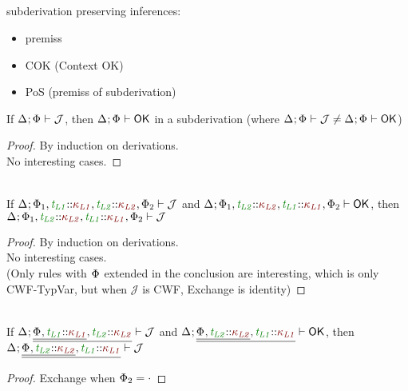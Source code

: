 \documentclass[11pt]{article}
\begin{document}
    \subsection*{}
    subderivation preserving inferences:
    \begin{itemize}
        \item premiss
        \item COK (Context OK)
        \item PoS (premiss of subderivation)
    \end{itemize}
    \begin{lemma}[COK]
        If $\J$, then $\ContextWellFormed$ in a subderivation (where $\J\neq\ContextWellFormed$)
    \end{lemma}
    \begin{proof}
        By induction on derivations. \\
        No interesting cases.
    \end{proof}
    \noindent\hrulefill
    \begin{lemma}[Exchange]
        \vphantom{.}\\
        If $\J[\HoleCtx\TypVarCtx[][1],\typvar[L1]\KndAssump\knd[L1],\typvar[L2]\KndAssump\knd[L2],\TypVarCtx[][2]]$ and $\ContextWellFormed[\HoleCtx\TypVarCtx[][1],\typvar[L2]\KndAssump\knd[L2],\typvar[L1]\KndAssump\knd[L1],\TypVarCtx[][2]]$, then $\J[\HoleCtx\TypVarCtx[][1],\typvar[L2]\KndAssump\knd[L2],\typvar[L1]\KndAssump\knd[L1],\TypVarCtx[][2]]$
    \end{lemma}
    \begin{proof}
        By induction on derivations. \\
        No interesting cases. \\
        (Only rules with $\TypVarCtx$ extended in the conclusion are interesting, which is only CWF-TypVar, but when $\mathcal{J}$ is CWF, Exchange is identity)
    \end{proof}
    \begin{corollary}
        \vphantom{.}\\
        If $\J[\HoleCtx\xxExtendTypVarCtx[][L1]{\knd[L1]}[L2]{\knd[L2]}]$ and $\ContextWellFormed[\HoleCtx\xxExtendTypVarCtx[][L2]{\knd[L2]}[L1]{\knd[L1]}]$, then $\J[\HoleCtx\xxExtendTypVarCtx[][L2]{\knd[L2]}[L1]{\knd[L1]}]$
    \end{corollary}
    \begin{proof}
        Exchange when $\TypVarCtx[][2]=\cdot$
    \end{proof}
    \noindent\hrulefill
\end{document}
